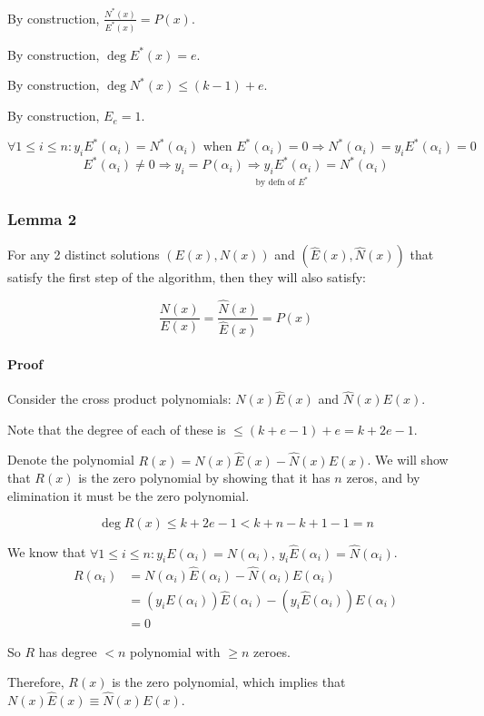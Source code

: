 \documentclass{idc_msc}
\begin{document}
By construction, \(\frac{N^*(x)}{E^*(x)} = P(x)\).

By construction, \(\deg E^*(x) = e\).

By construction, \(\deg N^*(x) \le (k-1)+ e\).

By construction, \(E_e = 1\).

\[ \forall 1 \le i \le n : y_i E^*(\alpha_i) = N^*(\alpha_i) \text{ when } E^*(\alpha_i) = 0 \Rightarrow N^*(\alpha_i) = y_i E^*(\alpha_i) = 0\]
\[E^*(\alpha_i) \ne 0 \Rightarrow \underset{\text{by defn of \(E^*\)}}{y_i=P(\alpha_i) \Rightarrow y_i E^*(\alpha_i) = N^*(\alpha_i)}\]

\subsubsection{Lemma 2}

For any 2 distinct solutions \((E(x), N(x))\) and \((\hat{E}(x), \hat{N}(x))\) that satisfy the first step of the algorithm, then they will also satisfy:

\[\frac{N(x)}{E(x)} = \frac{\hat{N}(x)}{\hat{E}(x)} = P(x)\]

\paragraph{Proof}

Consider the cross product polynomials: \(N(x)\hat{E}(x)\) and \(\hat{N}(x)E(x)\).

Note that the degree of each of these is \(\le (k+e-1) + e = k + 2e - 1\).

Denote the polynomial \(R(x) = N(x)\hat{E}(x) - \hat{N}(x)E(x)\).
We will show that \(R(x)\) is the zero polynomial by showing that it has \(n\) zeros, and by elimination it must be the zero polynomial.

\[\deg R(x) \le k + 2e - 1 < k + n - k + 1 - 1 = n\]

We know that \(\forall 1 \le i \le n : y_i E(\alpha_i) = N(\alpha_i),\, y_i \hat{E}(\alpha_i) = \hat{N}(\alpha_i)\).
\[
\begin{aligned}
R(\alpha_i) &= N(\alpha_i)\hat{E}(\alpha_i) - \hat{N}(\alpha_i)E(\alpha_i) \\
&= (y_i E(\alpha_i))\hat{E}(\alpha_i) - (y_i \hat{E}(\alpha_i))E(\alpha_i) \\
&= 0
\end{aligned}
\]

So \(R\) has degree \(< n\) polynomial with \(\ge n\) zeroes.

Therefore, \(R(x)\) is the zero polynomial, which implies that \(N(x)\hat{E}(x) \equiv \hat{N}(x)E(x)\).
\end{document}

